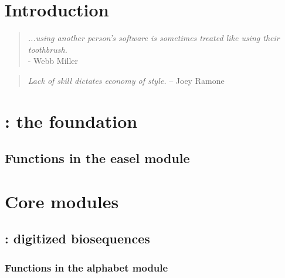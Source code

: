 \documentclass[10pt]{book}
\begin{document}


\newpage
\tableofcontents

\sloppy

\newpage
\chapter{Introduction}


\begin{quote}
 \emph{...using another person's software is sometimes treated like 
 using their toothbrush.}\\
\hspace*{1em}\hfill - Webb Miller \citep{Miller01}
\end{quote}

\vspace*{\fill}
\begin{quote}
\hspace*{1em}\hfill \emph{Lack of skill dictates economy of style.} \hspace{1em} -- Joey Ramone
\end{quote}     


\newpage
\chapter{: the foundation}

\section{Functions in the easel module}

\vspace*{\fill}


\newpage
\chapter{Core modules}

\section{: digitized biosequences}

\subsection{Functions in the alphabet module}

\end{document}
